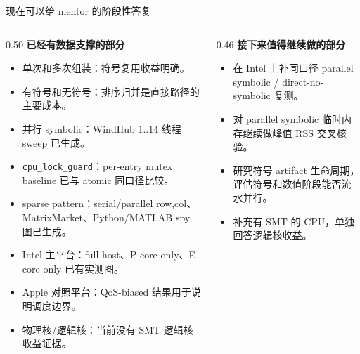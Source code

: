 \documentclass[UTF8,aspectratio=169,10pt]{ctexbeamer}
\begin{document}
\begin{frame}{现在可以给 mentor 的阶段性答复}
\begin{columns}[T,onlytextwidth]
\begin{column}{0.50\textwidth}
\textbf{已经有数据支撑的部分}
\begin{itemize}
  \item 单次和多次组装：符号复用收益明确。
  \item 有符号和无符号：排序归并是直接路径的主要成本。
  \item 并行 symbolic：WindHub 1..14 线程 sweep 已生成。
  \item \texttt{cpu\_lock\_guard}：per-entry mutex baseline 已与 atomic 同口径比较。
  \item sparse pattern：serial/parallel row,col、MatrixMarket、Python/MATLAB spy 图已生成。
  \item Intel 主平台：full-host、P-core-only、E-core-only 已有实测图。
  \item Apple 对照平台：QoS-biased 结果用于说明调度边界。
  \item 物理核/逻辑核：当前没有 SMT 逻辑核收益证据。
\end{itemize}
\end{column}
\begin{column}{0.46\textwidth}
\textbf{接下来值得继续做的部分}
\begin{itemize}
  \item 在 Intel 上补同口径 parallel symbolic / direct-no-symbolic 复测。
  \item 对 parallel symbolic 临时内存继续做峰值 RSS 交叉核验。
  \item 研究符号 artifact 生命周期，评估符号和数值阶段能否流水并行。
  \item 补充有 SMT 的 CPU，单独回答逻辑核收益。
\end{itemize}
\end{column}
\end{columns}
\end{frame}
\end{document}
